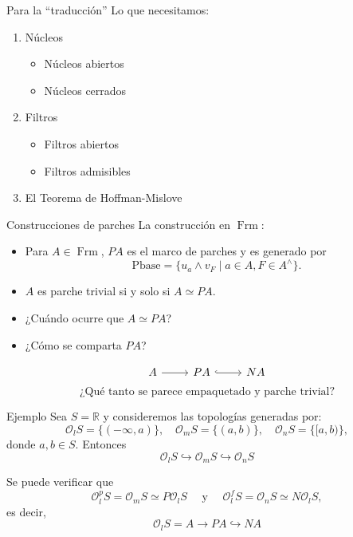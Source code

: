 \documentclass[compress,12pt]{beamer}
\DeclareMathOperator{\Frm}{Frm}
\begin{document}
\begin{frame}{Para la ``traducción''}
Lo que necesitamos:
\begin{enumerate}
\item Núcleos
\begin{itemize}
	\item Núcleos abiertos
	\item Núcleos cerrados
\end{itemize}
\item Filtros 
\begin{itemize}
	\item Filtros abiertos
	\item Filtros admisibles
\end{itemize}
\item El Teorema de Hoffman-Mislove
\end{enumerate}
\end{frame}

\begin{frame}[fragile]{Construcciones de parches}
	La construcción en $\Frm$:
	\begin{itemize}
		\item Para $A\in \Frm$, $PA$ es el marco de parches y es generado por 
		\[
		\mbox{Pbase}=\{u_a\wedge v_F\mid a\in A, F\in A^\wedge\}.
		\]
		\item $A$ es parche trivial si y solo si $A\simeq PA$.
		\item ¿Cuándo ocurre que $A\simeq PA$?
		\item ¿Cómo se comparta $PA$?
	\end{itemize}
	\[\begin{tikzcd}
	{A} & {PA} & {NA}
	\arrow[from=1-1, to=1-2]
	\arrow[hook, from=1-2, to=1-3]
\end{tikzcd}\]
\[
\mbox{¿Qué tanto se parece empaquetado y parche trivial?}
\]
\end{frame}

\begin{frame}[fragile]{Ejemplo}
Sea $S=\mathbb{R}$ y consideremos las topologías generadas por:
\[
\mathcal{O}_lS=\{(-\infty, a)\},\quad  \mathcal{O}_mS=\{(a,b)\}, \quad \mathcal{O}_nS=\{[a,b)\},
\]
donde $a,b\in S$. Entonces
\[
\mathcal{O}_lS \hookrightarrow \mathcal{O}_mS \hookrightarrow \mathcal{O}_nS
\]

Se puede verificar que 
\[
\mathcal{O}_l^pS=\mathcal{O}_mS\simeq P\mathcal{O}_lS\quad\mbox{ y }\quad\mathcal{O}_l^fS=\mathcal{O}_nS\simeq N\mathcal{O}_lS,
\]
es decir, 
\[
\mathcal{O}_lS=A\rightarrow PA\hookrightarrow NA
\]
\end{frame}
\end{document}

